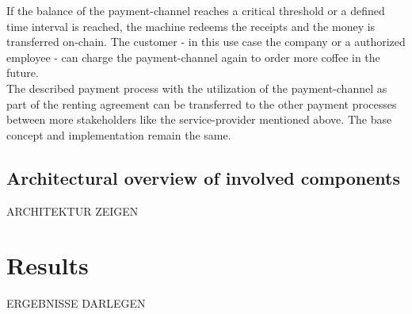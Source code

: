 \documentclass[conference]{IEEEtran}
\begin{document}
If the balance of the payment-channel reaches a critical threshold or a defined time interval is reached, the machine redeems the receipts and the money is transferred on-chain. The customer - in this use case the company or a authorized employee - can charge the payment-channel again to order more coffee in the future.\\
The described payment process with the utilization of the payment-channel as part of the renting agreement can be transferred to the other payment processes between more stakeholders like the service-provider mentioned above. The base concept and implementation remain the same.

\subsection{Architectural overview of involved components}
ARCHITEKTUR ZEIGEN

\section{Results}
ERGEBNISSE DARLEGEN









\end{document}

